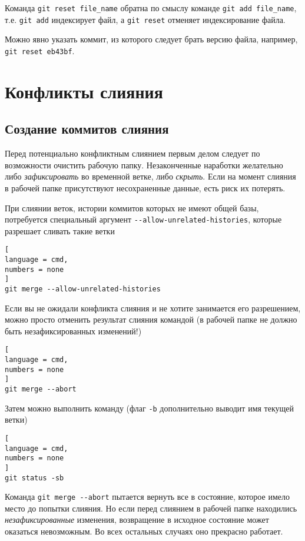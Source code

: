 \documentclass[%
	11pt,
	a4paper,
	utf8,
		]{article}
\begin{document}
Команда \texttt{git reset file\_name} обратна по смыслу команде \texttt{git add file\_name}, т.е. \texttt{git add} индексирует файл, а \texttt{git reset} отменяет индексирование файла.

Можно явно указать коммит, из которого следует брать версию файла, например, \texttt{git reset eb43bf}.

\section{Конфликты слияния}

\subsection{Создание коммитов слияния}

Перед потенциально конфликтным слиянием первым делом следует по возможности очистить рабочую папку. Незаконченные наработки желательно либо \emph{зафиксировать} во временной ветке, либо \emph{скрыть}. Если на момент слияния в рабочей папке присутствуют несохраненные данные, есть риск их потерять.

При слиянии веток, истории коммитов которых не имеют общей базы, потребуется специальный аргумент \verb|--allow-unrelated-histories|, которые разрешает сливать такие ветки
\begin{lstlisting}[
language = cmd,
numbers = none
]
git merge --allow-unrelated-histories
\end{lstlisting}

Если вы не ожидали конфликта слияния и не хотите занимается его разрешением, можно просто отменить результат слияния командой (в рабочей папке не должно быть незафиксированных изменений!)
\begin{lstlisting}[
language = cmd,
numbers = none
]
git merge --abort
\end{lstlisting}

Затем можно выполнить команду (флаг \verb|-b| дополнительно выводит имя текущей ветки)
\begin{lstlisting}[
language = cmd,
numbers = none
]
git status -sb
\end{lstlisting}

Команда \verb|git merge --abort| пытается вернуть все в состояние, которое имело место до попытки слияния. Но если перед слиянием в рабочей папке находились \emph{незафиксированные} изменения, возвращение в исходное состояние может оказаться невозможным. Во всех остальных случаях оно прекрасно работает.
\end{document}
